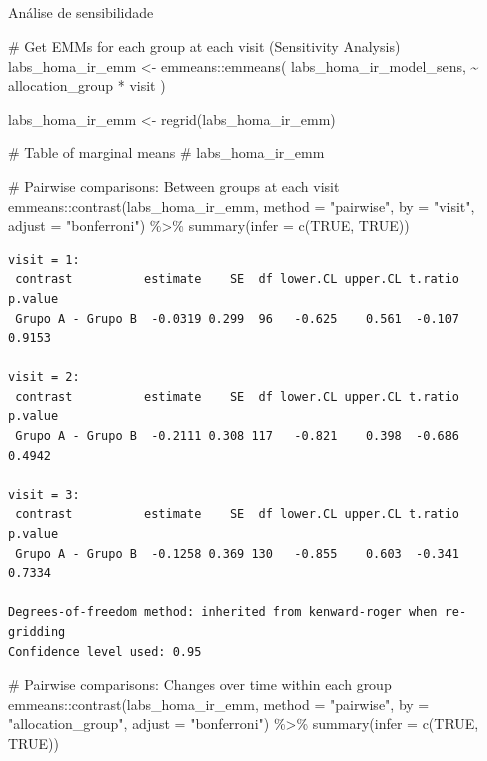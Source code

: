 \documentclass[
  12pt,
]{article}
\makeatletter
\let\oldsubparagraph\subparagraph
\renewcommand{\subparagraph}{
    \@ifstar
      \xxxSubParagraphStar
      \xxxSubParagraphNoStar
  }
\newcommand{\xxxSubParagraphStar}[1]{\oldsubparagraph*{#1}\mbox{}}
\newcommand{\xxxSubParagraphNoStar}[1]{\oldsubparagraph{#1}\mbox{}}
\newenvironment{Shaded}{\begin{snugshade}}{\end{snugshade}}
\newcommand{\AttributeTok}[1]{\textcolor[rgb]{0.40,0.45,0.13}{#1}}
\newcommand{\CommentTok}[1]{\textcolor[rgb]{0.37,0.37,0.37}{#1}}
\newcommand{\ConstantTok}[1]{\textcolor[rgb]{0.56,0.35,0.01}{#1}}
\newcommand{\FunctionTok}[1]{\textcolor[rgb]{0.28,0.35,0.67}{#1}}
\newcommand{\NormalTok}[1]{\textcolor[rgb]{0.00,0.23,0.31}{#1}}
\newcommand{\OtherTok}[1]{\textcolor[rgb]{0.00,0.23,0.31}{#1}}
\newcommand{\SpecialCharTok}[1]{\textcolor[rgb]{0.37,0.37,0.37}{#1}}
\newcommand{\StringTok}[1]{\textcolor[rgb]{0.13,0.47,0.30}{#1}}
\makeatother
\begin{document}
\subparagraph{Análise de
sensibilidade}\label{anuxe1lise-de-sensibilidade-11}

\begin{Shaded}
\begin{Highlighting}[]
\CommentTok{\# Get EMMs for each group at each visit (Sensitivity Analysis)}
\NormalTok{labs\_homa\_ir\_emm }\OtherTok{\textless{}{-}}\NormalTok{ emmeans}\SpecialCharTok{::}\FunctionTok{emmeans}\NormalTok{(}
\NormalTok{    labs\_homa\_ir\_model\_sens, }
    \SpecialCharTok{\textasciitilde{}}\NormalTok{ allocation\_group }\SpecialCharTok{*}\NormalTok{ visit}
\NormalTok{)}

\NormalTok{labs\_homa\_ir\_emm }\OtherTok{\textless{}{-}} \FunctionTok{regrid}\NormalTok{(labs\_homa\_ir\_emm)}

\CommentTok{\# Table of marginal means}
\CommentTok{\# labs\_homa\_ir\_emm}

\CommentTok{\# Pairwise comparisons: Between groups at each visit}
\NormalTok{emmeans}\SpecialCharTok{::}\FunctionTok{contrast}\NormalTok{(labs\_homa\_ir\_emm,}
\AttributeTok{method =} \StringTok{"pairwise"}\NormalTok{, }\AttributeTok{by =} \StringTok{"visit"}\NormalTok{,}
\AttributeTok{adjust =} \StringTok{"bonferroni"}\NormalTok{) }\SpecialCharTok{\%\textgreater{}\%} \FunctionTok{summary}\NormalTok{(}\AttributeTok{infer =} \FunctionTok{c}\NormalTok{(}\ConstantTok{TRUE}\NormalTok{, }\ConstantTok{TRUE}\NormalTok{))}
\end{Highlighting}
\end{Shaded}

\begin{verbatim}
visit = 1:
 contrast          estimate    SE  df lower.CL upper.CL t.ratio p.value
 Grupo A - Grupo B  -0.0319 0.299  96   -0.625    0.561  -0.107  0.9153

visit = 2:
 contrast          estimate    SE  df lower.CL upper.CL t.ratio p.value
 Grupo A - Grupo B  -0.2111 0.308 117   -0.821    0.398  -0.686  0.4942

visit = 3:
 contrast          estimate    SE  df lower.CL upper.CL t.ratio p.value
 Grupo A - Grupo B  -0.1258 0.369 130   -0.855    0.603  -0.341  0.7334

Degrees-of-freedom method: inherited from kenward-roger when re-gridding 
Confidence level used: 0.95 
\end{verbatim}

\begin{Shaded}
\begin{Highlighting}[]
\CommentTok{\# Pairwise comparisons: Changes over time within each group}
\NormalTok{emmeans}\SpecialCharTok{::}\FunctionTok{contrast}\NormalTok{(labs\_homa\_ir\_emm,}
\AttributeTok{method =} \StringTok{"pairwise"}\NormalTok{, }\AttributeTok{by =} \StringTok{"allocation\_group"}\NormalTok{,}
\AttributeTok{adjust =} \StringTok{"bonferroni"}\NormalTok{) }\SpecialCharTok{\%\textgreater{}\%} \FunctionTok{summary}\NormalTok{(}\AttributeTok{infer =} \FunctionTok{c}\NormalTok{(}\ConstantTok{TRUE}\NormalTok{, }\ConstantTok{TRUE}\NormalTok{))}
\end{Highlighting}
\end{Shaded}
\end{document}
